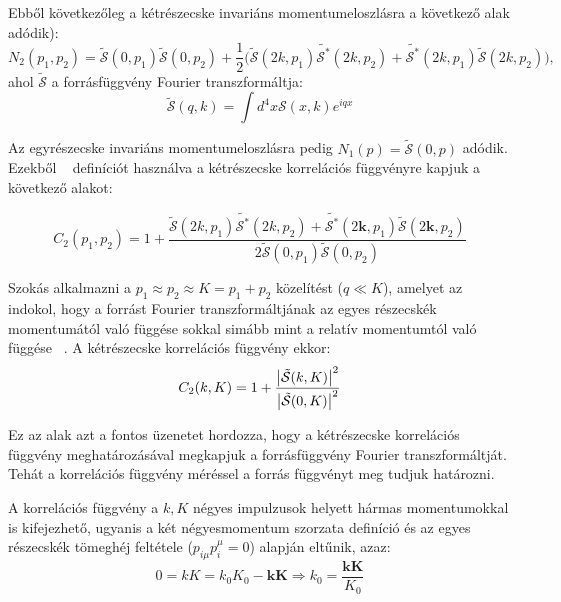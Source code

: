 \documentclass[10pt,a4paper]{article}
\numberwithin{equation}{subsection}
\numberwithin{figure}{section}
\begin{document}
Ebből következőleg a kétrészecske invariáns momentumeloszlásra a következő alak adódik):
\begin{equation}
N_2({p_1},{p_2})=\tilde{\mathcal{S}}(0, {p_1})\tilde{\mathcal{S}}(0, {p_2})+\frac{1}{2}\big(\tilde{\mathcal{S}}(2{k}, {p_1})\tilde{\mathcal{S^*}}(2{k}, {p_2})+\tilde{\mathcal{S^*}}(2{k},{ p_1})\tilde{\mathcal{S}}(2{k}, {p_2})\big),
\end{equation}
\noindent
ahol $\tilde{\mathcal{S}}$ a forrásfüggvény Fourier transzformáltja:
\begin{equation}
\tilde{\mathcal{S}}({q}, {k})=\int d^4x\mathcal{S}(x,k)e^{i{qx}}
\end{equation}

Az egyrészecske invariáns momentumeloszlásra pedig $N_1({p})=\tilde{\mathcal{S}}(0, {p})$ adódik. Ezekből ~ definíciót használva a kétrészecske korrelációs függvényre kapjuk a következő alakot:

\begin{equation}
C_2({p_1},{p_2}) = 1+ \frac{\tilde{\mathcal{S}}(2{k}, {p_1})\tilde{\mathcal{S^*}}(2{k}, {p_2})+\tilde{\mathcal{S^*}}(2\bm{k},{ p_1})\tilde{\mathcal{S}}(2\bm{k}, {p_2})}{2\tilde{\mathcal{S}}(0, {p_1})\tilde{\mathcal{S}}(0, {p_2})}
\end{equation}

Szokás alkalmazni a ${p_1}\approx {p_2}\approx {K} = p_1+p_2$ közelítést ($q\ll K$), amelyet az indokol, hogy a  forrást Fourier transzformáltjának az egyes részecskék momentumától való függése sokkal simább mint a relatív momentumtól való függése ~\cite{Lisa:2005dd}. A kétrészecske korrelációs függvény ekkor: 
\begin{equation}
C_2({k}, {K})=1+\frac{\abs{\tilde{\mathcal{S}}({k},{K})}^2}{\abs{\tilde{\mathcal{S}}(0,{K})}^2}
\label{eq:C02}
\end{equation}

Ez az alak azt a fontos üzenetet hordozza, hogy a kétrészecske korrelációs függvény meghatározásával megkapjuk a forrásfüggvény Fourier transzformáltját. Tehát a korrelációs függvény méréssel a forrás függvényt meg tudjuk határozni. 


A korrelációs függvény a $k,K$ négyes impulzusok helyett hármas momentumokkal is kifejezhető, ugyanis a két négyesmomentum szorzata definíció és az egyes részecskék tömeghéj feltétele ($p_{i\mu}p^{\mu}_i=0$) alapján eltűnik, azaz:
\begin{equation}
0=kK=k_0K_0-\bm{kK}\Rightarrow k_0 = \frac{\bm{kK}}{K_0}
\end{equation}
\end{document}
